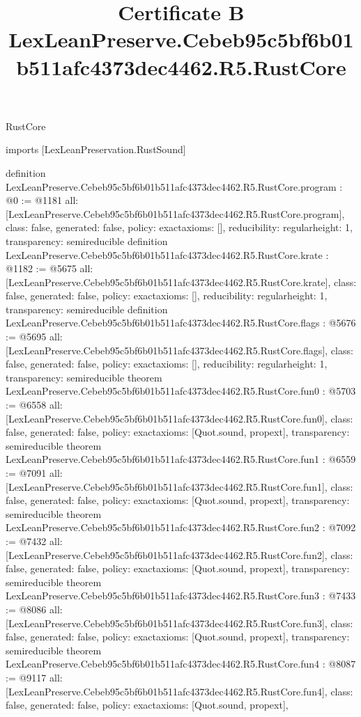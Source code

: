 \begin{lexlean}{RustCore}
\title{Certificate B LexLeanPreserve.Cebeb95c5bf6b01b511afc4373dec4462.R5.RustCore}
\begin{coremodule}
imports [LexLeanPreservation.RustSound]

definition LexLeanPreserve.Cebeb95c5bf6b01b511afc4373dec4462.R5.RustCore.program : @0 := @1181 {
  all: [LexLeanPreserve.Cebeb95c5bf6b01b511afc4373dec4462.R5.RustCore.program],
  class: false,
  generated: false,
  policy: exact{axioms: []},
  reducibility: regular{height: 1},
  transparency: semireducible
}
definition LexLeanPreserve.Cebeb95c5bf6b01b511afc4373dec4462.R5.RustCore.krate : @1182 := @5675 {
  all: [LexLeanPreserve.Cebeb95c5bf6b01b511afc4373dec4462.R5.RustCore.krate],
  class: false,
  generated: false,
  policy: exact{axioms: []},
  reducibility: regular{height: 1},
  transparency: semireducible
}
definition LexLeanPreserve.Cebeb95c5bf6b01b511afc4373dec4462.R5.RustCore.flags : @5676 := @5695 {
  all: [LexLeanPreserve.Cebeb95c5bf6b01b511afc4373dec4462.R5.RustCore.flags],
  class: false,
  generated: false,
  policy: exact{axioms: []},
  reducibility: regular{height: 1},
  transparency: semireducible
}
theorem LexLeanPreserve.Cebeb95c5bf6b01b511afc4373dec4462.R5.RustCore.fun0 : @5703 := @6558 {
  all: [LexLeanPreserve.Cebeb95c5bf6b01b511afc4373dec4462.R5.RustCore.fun0],
  class: false,
  generated: false,
  policy: exact{axioms: [Quot.sound, propext]},
  transparency: semireducible
}
theorem LexLeanPreserve.Cebeb95c5bf6b01b511afc4373dec4462.R5.RustCore.fun1 : @6559 := @7091 {
  all: [LexLeanPreserve.Cebeb95c5bf6b01b511afc4373dec4462.R5.RustCore.fun1],
  class: false,
  generated: false,
  policy: exact{axioms: [Quot.sound, propext]},
  transparency: semireducible
}
theorem LexLeanPreserve.Cebeb95c5bf6b01b511afc4373dec4462.R5.RustCore.fun2 : @7092 := @7432 {
  all: [LexLeanPreserve.Cebeb95c5bf6b01b511afc4373dec4462.R5.RustCore.fun2],
  class: false,
  generated: false,
  policy: exact{axioms: [Quot.sound, propext]},
  transparency: semireducible
}
theorem LexLeanPreserve.Cebeb95c5bf6b01b511afc4373dec4462.R5.RustCore.fun3 : @7433 := @8086 {
  all: [LexLeanPreserve.Cebeb95c5bf6b01b511afc4373dec4462.R5.RustCore.fun3],
  class: false,
  generated: false,
  policy: exact{axioms: [Quot.sound, propext]},
  transparency: semireducible
}
theorem LexLeanPreserve.Cebeb95c5bf6b01b511afc4373dec4462.R5.RustCore.fun4 : @8087 := @9117 {
  all: [LexLeanPreserve.Cebeb95c5bf6b01b511afc4373dec4462.R5.RustCore.fun4],
  class: false,
  generated: false,
  policy: exact{axioms: [Quot.sound, propext]},
}
\end{coremodule}
\end{lexlean}

